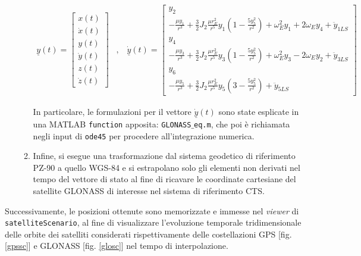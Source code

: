\documentclass[a4paper,11pt,twoside]{book}
\begin{document}
\begin{itemize}[-]
\begin{enumerate}
			\begin{equation}
				\begin{aligned}
					\underline{y}(t) = \begin{bmatrix}
						x(t)\\
						\dot{x}(t)\\
						y(t)\\
						\dot{y}(t)\\
						z(t)\\
						\dot{z}(t)
					\end{bmatrix}
				\end{aligned} \ \ , \ \ \begin{aligned}
				\underline{\dot{y}}(t) = \begin{bmatrix}
				y_2\\
				-\frac{\mu y_1}{r^3} + \frac{3}{2} J_2 \frac{\mu r_E^2}{r^5} y_1 \left( 1 - \frac{5y_5^2}{r^2} \right) + \omega_E^2y_1 + 2 \omega_E y_4 + \ddot{y}_{1LS} \\
				y_4 \\
				- \frac{\mu y_3}{r^3} + \frac{3}{2} J_2 \frac{\mu r_E^2}{r^5}y_3 \left( 1 - \frac{5 y_5^2}{r^2} \right) + \omega_E^2 y_3 - 2 \omega_E y_2 + \ddot{y}_{3LS} \\
				y_6\\
				- \frac{\mu y_5}{r^3} + \frac{3}{2} J_2 \frac{\mu r_E^2}{r^5}y_5 \left( 3 - \frac{5 y_5^2}{r^2} \right)  + \ddot{y}_{5LS}
			\end{bmatrix}
			\end{aligned}
			\end{equation}
		
			In particolare, le formulazioni per il vettore $\underline{\dot{y}}(t)$ sono state esplicate in una MATLAB \texttt{function} apposita: \texttt{GLONASS$\_$eq.m}, che poi è richiamata negli input di \texttt{ode45} per procedere all'integrazione numerica.
		
		\item Infine, si esegue una trasformazione dal sistema geodetico di riferimento PZ-90 a quello WGS-84 e si estrapolano solo gli elementi non derivati nel tempo del vettore di stato al fine di ricavare le coordinate cartesiane del satellite GLONASS di interesse nel sistema di riferimento CTS.
		\end{enumerate}
	\end{itemize}
	
	Successivamente, le posizioni ottenute sono memorizzate e immesse nel \textit{viewer} di \texttt{satelliteScenario}, al fine di visualizzare l'evoluzione temporale tridimensionale delle orbite dei satelliti considerati rispettivamente delle costellazioni GPS [fig. \ref{gpssc}] e GLONASS [fig. \ref{glosc}] nel tempo di interpolazione.
	
\end{document}

